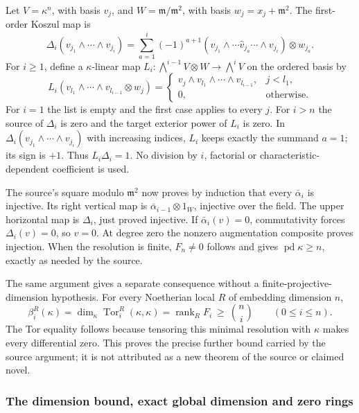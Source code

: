Let \(V=\kappa^n\), with basis \(v_j\), and \(W=\mathfrak m/\mathfrak m^2\), with basis \(w_j=x_j+\mathfrak m^2\). The first-order Koszul map is \[
\Delta_i(v_{j_1}\wedge\cdots\wedge v_{j_i})
=\sum_{a=1}^i(-1)^{a+1}
(v_{j_1}\wedge\cdots\widehat v_{j_a}\cdots\wedge v_{j_i})\otimes w_{j_a}.
\] For \(i\ge1\), define a \(\kappa\)-linear map \(L_i:\bigwedge^{i-1}V\otimes W\to\bigwedge^iV\) on the ordered basis by \[
L_i(v_{l_1}\wedge\cdots\wedge v_{l_{i-1}}\otimes w_j)
=\begin{cases}
v_j\wedge v_{l_1}\wedge\cdots\wedge v_{l_{i-1}},
 &j<l_1,\\
0,&\text{otherwise}.
\end{cases}
\] For \(i=1\) the list is empty and the first case applies to every \(j\). For \(i>n\) the source of \(\Delta_i\) is zero and the target exterior power of \(L_i\) is zero. In \(\Delta_i(v_{j_1}\wedge\cdots\wedge v_{j_i})\) with increasing indices, \(L_i\) keeps exactly the summand \(a=1\); its sign is \(+1\). Thus \(L_i\Delta_i=1\). No division by \(i\), factorial or characteristic-dependent coefficient is used.

The source's square modulo \(\mathfrak m^2\) now proves by induction that every \(\bar\alpha_i\) is injective. Its right vertical map is \(\bar\alpha_{i-1}\otimes1_W\), injective over the field. The upper horizontal map is \(\Delta_i\), just proved injective. If \(\bar\alpha_i(v)=0\), commutativity forces \(\Delta_i(v)=0\), so \(v=0\). At degree zero the nonzero augmentation composite proves injection. When the resolution is finite, \(F_n\ne0\) follows and gives \(\operatorname{pd}\kappa\ge n\), exactly as needed by the source.

The same argument gives a separate consequence without a finite-projective-dimension hypothesis. For every Noetherian local \(R\) of embedding dimension \(n\), \[
\beta_i^R(\kappa)=\dim_\kappa\operatorname{Tor}_i^R(\kappa,\kappa)
=\operatorname{rank}_RF_i\ \ge\ \binom ni\qquad(0\le i\le n).
\] The Tor equality follows because tensoring this minimal resolution with \(\kappa\) makes every differential zero. This proves the precise further bound carried by the source argument; it is not attributed as a new theorem of the source or claimed novel.

\subsubsection{The dimension bound, exact global dimension and zero rings}\label{the-dimension-bound-exact-global-dimension-and-zero-rings}

